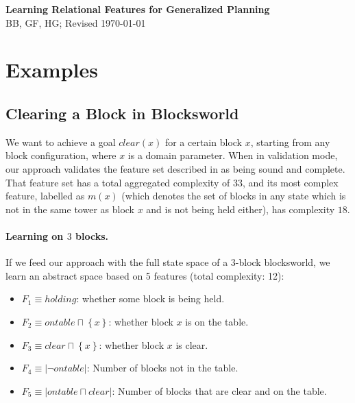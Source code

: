\documentclass[12pt]{article}
\newcommand{\set}[1]{\ensuremath{\left\{#1 \right\}}}
\newcommand{\abs}[1]{\ensuremath{\left\vert{#1}\right\vert}}
\begin{document}
\begin{center}
  \textbf{\large Learning Relational Features for Generalized Planning} \\
  BB, GF, HG; Revised \today
\end{center}


\section{Examples}


\subsection{Clearing a Block in Blocksworld}
We want to achieve a goal $clear(x)$ for a certain block $x$, starting from
any block configuration, where $x$ is a domain parameter.
When in validation mode, our approach validates
the feature set described in \citep{bonet2018features} as being sound and complete.
That feature set has a total aggregated complexity of $33$, and its most complex feature,
labelled as $m(x)$ (which denotes the set of blocks in any state which
is not in the same tower as block $x$ and is not being held either), has complexity $18$.


\paragraph{Learning on $3$ blocks.}
If we feed our approach with the full state space of a 3-block blocksworld, we learn an abstract space based on 5 features (total complexity: 12):

\begin{itemize}
 \item $F_1 \equiv holding$: whether some block is being held.
 \item $F_2 \equiv ontable \sqcap \set{x}$: whether block $x$ is on the table.
 \item $F_3 \equiv clear \sqcap \set{x}$: whether block $x$ is clear.
 
 \item $F_4 \equiv \abs{\neg ontable}$: Number of blocks not in the table.
 \item $F_5 \equiv \abs{ontable \sqcap clear}$: Number of blocks that are clear and on the table.
 
\end{itemize}
\end{document}
